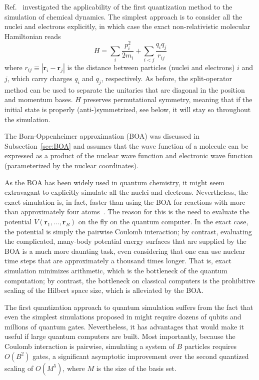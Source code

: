 \documentclass[11pt,oneside,final]{huthesis}%
\begin{document}
Ref.~\cite{Kassal08} investigated the applicability of the first quantization method to the
simulation of chemical dynamics. The simplest approach is to
consider all the nuclei and electrons explicitly, in which case the exact
non-relativistic molecular Hamiltonian reads
\begin{equation}
H=\sum_i \frac{p_i^2}{2m_i} + \sum_{i<j} \frac{q_i q_j}{r_{ij}}
\end{equation}
where $r_{ij}\equiv|\mathbf{r}_i-\mathbf{r}_j|$ is the distance between
particles (nuclei and electrons) $i$ and $j$, which carry charges $q_i$ and $q_j$, respectively.  As
before, the split-operator method can be used to separate the unitaries that are
diagonal in the position and momentum bases. $H$ preserves permutational symmetry, meaning
that if the initial state is properly (anti-)symmetrized, see below, it will
stay so throughout the simulation.


The Born-Oppenheimer approximation (BOA) was discussed in Subsection~\ref{sec:BOA} and
assumes that the wave function of a molecule can be 
expressed as a product of the nuclear wave function and electronic wave function
(parameterized by the nuclear coordinates).%

As the BOA has been widely used in quantum
chemistry, it might seem extravagant to explicitly simulate all the nuclei and
electrons. Nevertheless, the exact simulation is, in fact, faster than using the
BOA for reactions with more than approximately four atoms~\cite{Kassal08}. 
The reason for this is the need to evaluate the potential
$V(\mathbf{r}_1,\ldots,\mathbf{r}_B)$ on the fly on the quantum computer. In the
exact case, the potential is simply the pairwise Coulomb interaction; by
contrast, evaluating the complicated, many-body potential energy surfaces that
are supplied by the BOA is a much more daunting task, even considering that one
can use nuclear time steps that are approximately a thousand times longer. That is,
exact simulation minimizes arithmetic, which is the bottleneck of the quantum
computation; by contrast, the bottleneck on classical computers is the
prohibitive scaling of the Hilbert space size, which is alleviated by the BOA.



The first quantization approach to quantum simulation suffers from the fact that
even the simplest simulations proposed in \cite{Kassal08}
might require dozens of qubits and millions of
quantum gates. Nevertheless, it has advantages that would make
it useful if large quantum computers are built. Most importantly, because the
Coulomb interaction is pairwise, simulating a system of $B$ particles requires
$O(B^2)$ gates, a significant asymptotic improvement over the second quantized
scaling of $O(M^5)$, where $M$ is the size of the basis set.
\end{document}
